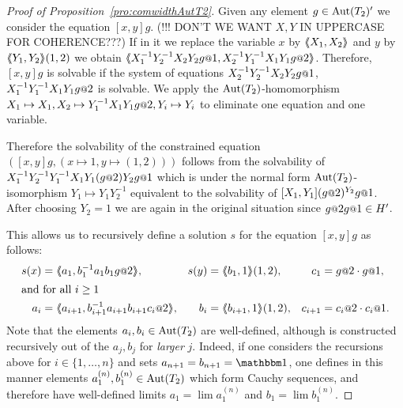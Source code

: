 \documentclass[a4paper,11pt]{amsart}
\begin{document}
\begin{proof}[Proof of Proposition~\ref{pro:comwidthAutT2}]
 Given any element $g\in \operatorname{{Aut}}(T_2)'$ we consider the equation $[x,y]g$. (!!! DON'T WE WANT $X,Y$ IN UPPERCASE FOR COHERENCE???)
 If in it we replace the variable $x$ by $\langle\negthickspace\langle X_1,X_2\rangle\negthickspace\rangle$ and $y$ by $\langle\negthickspace\langle Y_1,Y_2\rangle\negthickspace\rangle(1,2)$ 
 we obtain $\pair{X_1^{-1}Y_2^{-1}X_2Y_2g\at{1},X_2^{-1}Y_1^{-1}X_1Y_1g\at{2}}$. Therefore, $[x,y]g$ is solvable if
 the system of equations $X_2^{-1}Y_2^{-1}X_2Y_2g\at{1}$, $X_1^{-1}Y_1^{-1}X_1Y_1g\at{2}$ is solvable. We apply the $\operatorname{{Aut}}(T_2)$-homomorphism $X_1\mapsto X_1,X_2\mapsto Y_1^{-1}X_1Y_1 g\at{2},Y_i\mapsto Y_i$ to eliminate one equation and one variable.
 
 Therefore the solvability of the constrained equation
 $\left([x,y]g, (x\mapsto 1,y\mapsto (1,2)) \right)$ follows from the solvability of
 $X_1^{-1}Y_2^{-1}Y_1^{-1}X_1Y_1(g\at{2}) Y_2 g\at{1}$ which is under the 
 normal form $\operatorname{{Aut}}(T_2)$-isomorphism $Y_1\mapsto Y_1Y_2^{-1}$ equivalent to the 
 solvability of $[X_1,Y_1](g\at{2})^{Y_2} g\at{1}$. After choosing $Y_2=1$ we are 
 again in the original situation since $g\at{2} g\at{1}\in H'$. 
 
 This allows us to recursively define a solution $s$ for the equation $[x,y]g$ as follows:
\begin{align*}
  s(x) &= \pair{a_1,b_1^{-1}a_1b_1 g\at{2} }, & s(y) &=\pair{b_1,1}(1,2), &c_1&=g\at{2} \cdot g\at{1}, \\
\intertext{and for all $i\ge1$}
  a_{i} &= \pair{a_{i+1},b_{i+1}^{-1}a_{i+1}b_{i+1} c_i\at{2} }, & b_{i} &=\pair{b_{i+1},1}(1,2),&c_{i+1}&=c_{i}\at{2} \cdot c_{i}\at{1}. 
 \end{align*}
 Note that the elements $a_i,b_i\in\operatorname{{Aut}}(T_2)$ are well-defined,
 although is constructed recursively out of the $a_j,b_j$ for
 \emph{larger} $j$. Indeed, if one considers the recursions above for
 $i\in\{1,\dots,n\}$ and sets $a_{n+1}=b_{n+1}=\id$, one defines in
 this manner elements $a_1^{(n)},b_1^{(n)}\in\operatorname{{Aut}}(T_2)$ which form
 Cauchy sequences, and therefore have well-defined limits
 $a_1=\lim a_1^{(n)}$ and $b_1=\lim b_1^{(n)}$.
\end{proof}
\end{document}
